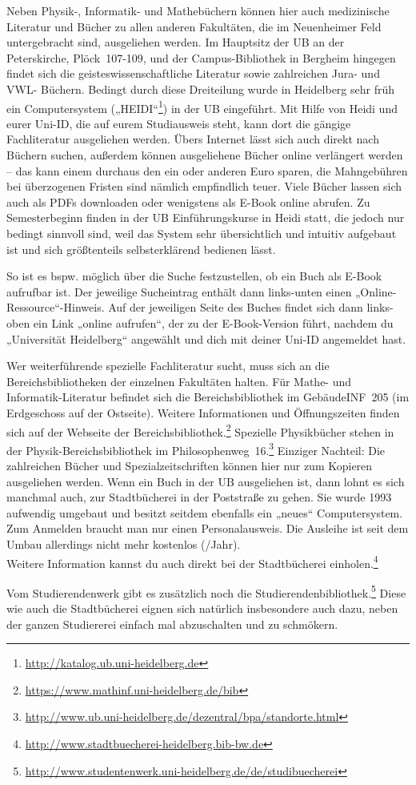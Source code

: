 Neben Physik-, Informatik- und Mathebüchern können hier auch medizinische Literatur und Bücher zu allen anderen Fakultäten, die im Neuenheimer Feld untergebracht sind, ausgeliehen werden. Im Hauptsitz der \gls{UB} an der Peterskirche, Plöck~107-109, und der Campus-Bibliothek in Bergheim hingegen findet sich die geisteswissenschaftliche Literatur sowie zahlreichen Jura- und VWL- Büchern. Bedingt durch diese Dreiteilung wurde in Heidelberg sehr früh ein Computersystem („\gls{HEIDI}“\footnote{\url{http://katalog.ub.uni-heidelberg.de}}) in der UB eingeführt. Mit Hilfe von Heidi und eurer Uni-ID, die auf eurem Studiausweis steht, kann dort die gängige Fachliteratur ausgeliehen werden. Übers Internet lässt sich auch direkt nach Büchern suchen, außerdem können ausgeliehene Bücher online verlängert werden -- das kann einem durchaus den ein oder anderen Euro sparen, die Mahngebühren bei überzogenen Fristen sind nämlich empfindlich teuer. Viele Bücher lassen sich auch als PDFs downloaden oder wenigstens als E-Book online abrufen. Zu Semesterbeginn finden in der UB Einführungskurse in Heidi statt, die jedoch nur bedingt sinnvoll sind, weil das System sehr übersichtlich und intuitiv aufgebaut ist und sich größtenteils selbsterklärend bedienen lässt.

So ist es bspw. möglich über die Suche festzustellen, ob ein Buch als E-Book aufrufbar ist. Der jeweilige Sucheintrag enthält dann links-unten einen „Online-Ressource“-Hinweis. Auf der jeweiligen Seite des Buches findet sich dann links-oben ein Link „online aufrufen“, der zu der E-Book-Version führt, nachdem du „Universität Heidelberg“ angewählt und dich mit deiner Uni-ID angemeldet hast.  

Wer weiterführende spezielle Fachliteratur sucht, muss sich an die Bereichsbibliotheken der einzelnen Fakultäten halten. Für Mathe- und Informatik-Literatur befindet sich die Bereichsbibliothek im Gebäude\-\gls{INF}~205 (im Erdgeschoss auf der Ostseite). Weitere Informationen und Öffnungszeiten finden sich auf der Webseite der Bereichsbibliothek.\footnote{\url{https://www.mathinf.uni-heidelberg.de/bib}} Spezielle Physikbücher stehen in der Physik-Bereichsbibliothek im Philosophenweg~16.\footnote{\url{http://www.ub.uni-heidelberg.de/dezentral/bpa/standorte.html}} Einziger Nachteil: Die zahlreichen Bücher und Spezialzeitschriften können hier nur zum Kopieren ausgeliehen werden. Wenn ein Buch in der UB ausgeliehen ist, dann lohnt es sich manchmal auch, zur Stadtbücherei in der Poststraße zu gehen. Sie wurde 1993 aufwendig umgebaut und besitzt seitdem ebenfalls ein „neues“ Computersystem. Zum Anmelden braucht man nur einen Personalausweis. Die Ausleihe ist seit dem Umbau allerdings nicht mehr kostenlos (/Jahr).\\ Weitere Information kannst du auch direkt bei der Stadtbücherei einholen.\footnote{\url{http://www.stadtbuecherei-heidelberg.bib-bw.de}}

Vom Studierendenwerk gibt es zusätzlich noch die Studierendenbibliothek.\footnote{\url{http://www.studentenwerk.uni-heidelberg.de/de/studibuecherei}} Diese wie auch die Stadtbücherei eignen sich natürlich insbesondere auch dazu, neben der ganzen Studiererei einfach mal abzuschalten und zu schmökern.